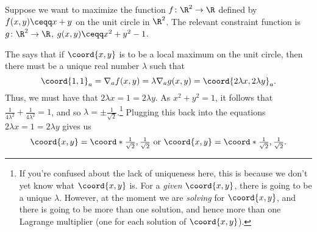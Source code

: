 \begin{exm}{}{}
Suppose we want to maximize the function $f\colon \R ^2\rightarrow \R$ defined by $f(x,y)\ceqq x+y$ on the unit circle in $\R ^2$.  The relevant constraint function is $g\colon \R ^2\rightarrow \R$, $g(x,y)\ceqq x^2+y^2-1$.

The  says that if $\coord{x,y}$ is to be a local maximum on the unit circle, then there must be a unique real number $\lambda$ such that
\begin{equation}
\coord{1,1}_a=\nabla _af(x,y)=\lambda \nabla _ag(x,y)=\coord{2\lambda x,2\lambda y}_a.
\end{equation}
Thus, we must have that $2\lambda x=1=2\lambda y$.  As $x^2+y^2=1$, it follows that $\frac{1}{4\lambda ^2}+\frac{1}{4\lambda ^2}=1$, and so $\lambda =\pm \frac{1}{\sqrt{2}}$.\footnote{If you're confused about the lack of uniqueness here, this is because we don't yet know what $\coord{x,y}$ is.  For a \emph{given} $\coord{x,y}$, there is going to be a unique $\lambda$.  However, at the moment we are \emph{solving} for $\coord{x,y}$, and there is going to be more than one solution, and hence more than one Lagrange multiplier (one for each solution of $\coord{x,y}$).}  Plugging this back into the equations $2\lambda x=1=2\lambda y$ gives us
\begin{equation}
\coord{x,y}=\coord*{\tfrac{1}{\sqrt{2}},\tfrac{1}{\sqrt{2}}}\text{ or }\coord{x,y}=\coord*{\tfrac{1}{\sqrt{2}},\tfrac{1}{\sqrt{2}}}.
\end{equation}
\end{exm}

